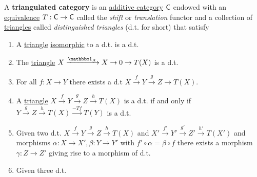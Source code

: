 \documentclass[../../main]{subfiles}
\begin{document}
\begin{definition}\label{def:triangulated-category}
  A \textbf{triangulated category} is an \hyperref[def:additive-category]{additive category} \(\mathsf{C}\) endowed with an \hyperref[def:equivalent-categories]{equivalence} \(T: \mathsf{C} \to \mathsf{C}\) called the \textit{shift} or \textit{translation} functor and a collection of \hyperref[def:triangle]{triangles} called \textit{distinguished triangles} (d.t. for short) that satisfy
  \begin{enumerate}[start=0, label=Tr.\arabic*), ref=Tr.\arabic*]
    \item\label{axiom:tr-0} A \hyperref[def:triangle]{triangle} \hyperref[def:categorical-isomorphism]{isomorphic} to a d.t. is a d.t.
    \item\label{axiom:tr-1} The \hyperref[def:triangle]{triangle} \(X \xrightarrow{\id_{X}} X \to 0 \to T(X)\) is a d.t.
    \item\label{axiom:tr-2} For all \(f: X \to Y\) there exists a d.t \(X \xrightarrow{f} Y \xrightarrow{g} Z \to T(X)\).
    \item\label{axiom:tr-3} A \hyperref[def:triangle]{triangle} \(X \xrightarrow{f} Y \xrightarrow{g} Z \xrightarrow{h} T(X)\) is a d.t. if and only if \(Y \xrightarrow{g} Z \xrightarrow{h} T(X) \xrightarrow{-Tf} T(Y)\) is a d.t.
    \item\label{axiom:tr-4} Given two d.t. \(X \xrightarrow{f} Y \xrightarrow{g} Z \xrightarrow{h} T(X)\) and \(X' \xrightarrow{f'} Y' \xrightarrow{g'} Z' \xrightarrow{h'} T(X')\) and morphisms \(\alpha: X \to X', \beta: Y \to Y'\) with \(f' \circ \alpha = \beta \circ f\) there exists a morphism \(\gamma: Z \to Z'\) giving rise to a morphism of d.t.
          \begin{center}
          \end{center}
    \item\label{axiom:tr-5} Given three d.t.
          \begin{center}
\end{center}
\end{enumerate}
\end{definition}
\end{document}
